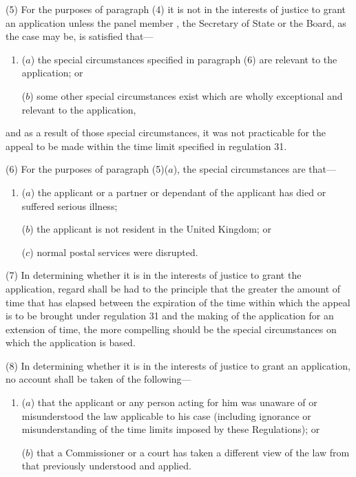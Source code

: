 \documentclass[12pt,a4paper]{article}
\begin{document}
(5) For the purposes of paragraph (4) it is not in the interests of justice to grant an application unless the panel member%
, the Secretary of State or the Board, as the case may be,  %
is satisfied that—
\begin{enumerate}\item[]
($a$) the special circumstances specified in paragraph (6) are relevant to the application; or

($b$) some other special circumstances exist which are wholly exceptional and relevant to the application,
\end{enumerate}
and as a result of those special circumstances, it was not practicable for the 
appeal to be made  %
within the time limit specified in regulation 31.

(6) For the purposes of paragraph (5)($a$), the special circumstances are that—
\begin{enumerate}\item[]
($a$) the applicant or a 
partner  %
or dependant of the applicant has died or suffered serious illness;

($b$) the applicant is not resident in the United Kingdom; or

($c$) normal postal services were disrupted.
\end{enumerate}

(7) In determining whether it is in the interests of justice to grant the application, 
regard shall be had  %
to the principle that the greater the amount of time that has elapsed between the expiration of the time within which the appeal is to be brought under regulation 31 and the making of the application for an extension of time, the more compelling should be the special circumstances on which the application is based.

(8) In determining whether it is in the interests of justice to grant an application, no account shall be taken of the following—
\begin{enumerate}\item[]
($a$) that the applicant or any person acting for him was unaware of or misunderstood the law applicable to his case (including ignorance or misunderstanding of the time limits imposed by these Regulations); or

($b$) that a Commissioner or a court has taken a different view of the law from that previously understood and applied.
\end{enumerate}
\end{document}
